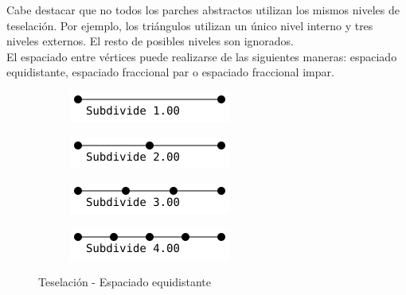 Cabe destacar que no todos los parches abstractos utilizan los mismos niveles de
teselación. Por ejemplo, los triángulos utilizan un único nivel interno y tres
niveles externos. El resto de posibles niveles son ignorados. \\

El espaciado entre vértices puede realizarse de las siguientes maneras:
espaciado equidistante, espaciado fraccional par o espaciado fraccional impar.

\begin{figure}[h]
	\centering
	\begin{subfigure}{.45\textwidth}
			\includegraphics[width=\textwidth]{figures/equal1.png}	
	\end{subfigure}	
	\hfill
	\begin{subfigure}{.45\textwidth}
			\includegraphics[width=\textwidth]{figures/equal2.png}	
	\end{subfigure}	
	\newline
	\begin{subfigure}{.45\textwidth}
			\includegraphics[width=\textwidth]{figures/equal3.png}	
	\end{subfigure}	
	\hfill
	\begin{subfigure}{.45\textwidth}
			\includegraphics[width=\textwidth]{figures/equal4.png}	
	\end{subfigure}	
	\caption{Teselación - Espaciado equidistante}
	\label{fig3.2}
\end{figure}

